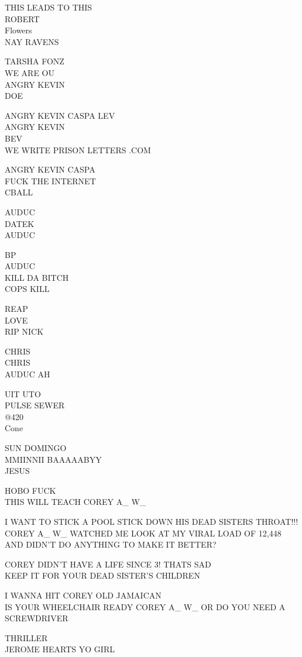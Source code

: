 \documentclass[10pt,letterpaper]{article}
\begin{document}
THIS LEADS TO THIS\\
ROBERT\\
Flowers\\
NAY RAVENS

TARSHA FONZ\\
WE ARE OU\\
ANGRY KEVIN\\
DOE

ANGRY KEVIN CASPA LEV\\
ANGRY KEVIN\\
BEV\\
WE WRITE PRISON LETTERS .COM

ANGRY KEVIN CASPA\\
FUCK THE INTERNET\\
CBALL

AUDUC\\
DATEK\\
AUDUC

BP\\
AUDUC\\
KILL DA BITCH\\
COPS KILL

REAP\\
LOVE\\
RIP NICK

CHRIS\\
CHRIS\\
AUDUC AH

UIT UTO\\
PULSE SEWER\\
@420\\
Cone

SUN DOMINGO\\
MMIINNII BAAAAABYY\\
JESUS

HOBO FUCK\\
THIS WILL TEACH COREY A\_ W\_

I WANT TO STICK A POOL STICK DOWN HIS DEAD SISTERS THROAT!!!\\
COREY A\_ W\_ WATCHED ME LOOK AT MY VIRAL LOAD OF 12,448 AND DIDN'T DO ANYTHING TO MAKE IT BETTER?

COREY DIDN'T HAVE A LIFE SINCE 3!  THATS SAD\\
KEEP IT FOR YOUR DEAD SISTER'S CHILDREN

I WANNA HIT COREY OLD JAMAICAN\\
IS YOUR WHEELCHAIR READY COREY A\_ W\_ OR DO YOU NEED A SCREWDRIVER

THRILLER\\
JEROME HEARTS YO GIRL
\end{document}
